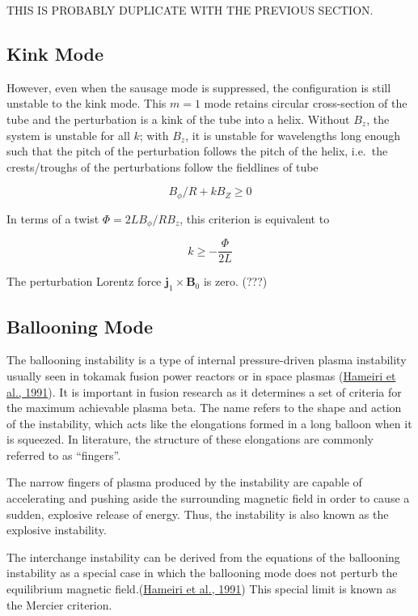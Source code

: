 \documentclass[
  notoc %
]{tufte-book}
\begin{document}
THIS IS PROBABLY DUPLICATE WITH THE PREVIOUS SECTION.

\hypertarget{kink-mode-1}{%
\subsection{Kink Mode}\label{kink-mode-1}}

However, even when the sausage mode is suppressed, the configuration is
still unstable to the kink mode. This \(m=1\) mode retains circular
cross-section of the tube and the perturbation is a kink of the tube
into a helix. Without \(B_z\), the system is unstable for all \(k\);
with \(B_z\), it is unstable for wavelengths long enough such that the
pitch of the perturbation follows the pitch of the helix, i.e.~the
crests/troughs of the perturbations follow the fieldlines of tube

\[
B_\phi/R + k B_Z \ge 0
\]

In terms of a twist \(\Phi = 2LB_\phi/RB_z\), this criterion is
equivalent to

\[
k\ge-\frac{\Phi}{2L}
\]

The perturbation Lorentz force \(\mathbf{j}_1\times\mathbf{B}_0\) is
zero. (???)

\hypertarget{sec:ballooning}{%
\subsection{Ballooning Mode}\label{sec:ballooning}}

The ballooning instability is a type of internal pressure-driven plasma
instability usually seen in tokamak fusion power reactors or in space
plasmas (\protect\hyperlink{ref-hameiri1991ballooning}{Hameiri et al.,
1991}). It is important in fusion research as it determines a set of
criteria for the maximum achievable plasma beta. The name refers to the
shape and action of the instability, which acts like the elongations
formed in a long balloon when it is squeezed. In literature, the
structure of these elongations are commonly referred to as ``fingers''.

The narrow fingers of plasma produced by the instability are capable of
accelerating and pushing aside the surrounding magnetic field in order
to cause a sudden, explosive release of energy. Thus, the instability is
also known as the explosive instability.

The interchange instability can be derived from the equations of the
ballooning instability as a special case in which the ballooning mode
does not perturb the equilibrium magnetic
field.(\protect\hyperlink{ref-hameiri1991ballooning}{Hameiri et al.,
1991}) This special limit is known as the Mercier criterion.
\end{document}
